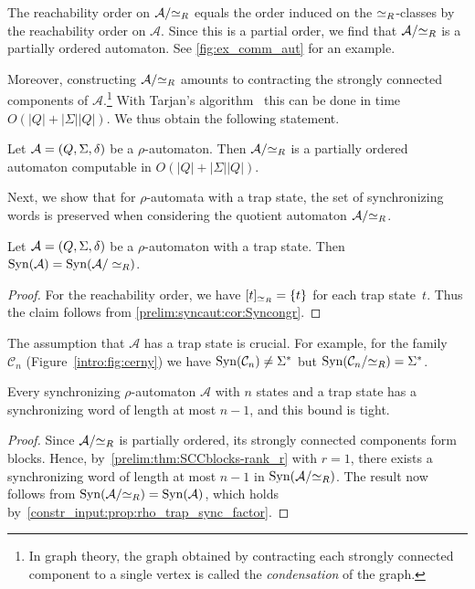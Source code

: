 The reachability order on $\mathcal A / {\simeq_R}$
equals the order induced on the $\simeq_R$-classes by the reachability order on $\mathcal A$.
Since this is a partial order, we find that $\mathcal A / {\simeq_R}$
is a partially ordered automaton.
See \cref{fig:ex_comm_aut}
for an example. 

Moreover, constructing $\mathcal A / {\simeq_R}$ amounts to contracting the
strongly connected components of $\mathcal A$.\footnote{In graph theory, the
	graph obtained by contracting each strongly connected component to a single
	vertex is called the \emph{condensation} of the graph.} With Tarjan's
algorithm~\cite{DBLP:journals/siamcomp/Tarjan72} this can be done in time  $O(|Q| + |\Sigma||Q|)$.
We thus obtain the following statement.



\begin{proposition}
	\label{constr_input:prop:factor_rho_aut_pto}
	Let $\mathcal A = (Q, \Sigma, \delta)$ be a $\rho$-automaton.
	Then $\mathcal A / {\simeq_R}$ is a partially ordered automaton
	computable in $O(|Q| + |\Sigma||Q|)$.
\end{proposition}

Next, we show that for $\rho$-automata with a trap state, the set of synchronizing words is preserved when considering the quotient automaton $\mathcal A / {\simeq_R}$.

\begin{proposition}
	\label{constr_input:prop:rho_trap_sync_factor}
	Let $\mathcal A = (Q, \Sigma, \delta)$ be a $\rho$-automaton
	with a trap state.
	Then $\operatorname{Syn}(\mathcal A) = \operatorname{Syn}(\mathcal A / \simeq_R)$.
\end{proposition}
\begin{proof}
	For the reachability order,
	we have $[t]_{\simeq_R} = \{t\}$ for each trap state~$t$.
	Thus the claim follows from \cref{prelim:syncaut:cor:Syncongr}.	
\end{proof}

The assumption that $\mathcal A$
has a trap state is crucial. For example,
for the \Cerny family~$\mathcal C_n$ 
(Figure~\ref{intro:fig:cerny})
we have $\operatorname{Syn}(\mathcal C_n) \ne \Sigma^*$
but $\operatorname{Syn}(\mathcal C_n / {\simeq_R}) = \Sigma^*$.

\begin{corollary} \label{constr_input:prop:rho_trap_resetlength}
	Every synchronizing $\rho$-automaton $\mathcal A$ with $n$ states and a trap state
	has a synchronizing word of length at most $n-1$,
	and this bound is tight.
\end{corollary}
\begin{proof}
	Since $\mathcal A / {\simeq_R}$ is partially ordered, its strongly connected
	components form blocks. Hence, by~\cref{prelim:thm:SCCblocks-rank_r}
	with $r = 1$, there exists a synchronizing word of length at most $n-1$
	in $\operatorname{Syn}(\mathcal A / {\simeq_R})$.
	The result now follows from
	$\operatorname{Syn}(\mathcal A / {\simeq_R}) = \operatorname{Syn}(\mathcal A)$,
	which holds by~\cref{constr_input:prop:rho_trap_sync_factor}.
\end{proof}

